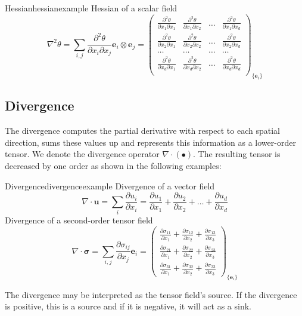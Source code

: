 \begin{example}{Hessian}{hessianexample}
    Hessian of a scalar field
    \begin{equation}
        \nabla^2 \theta = \sum_{i,j} \frac{\partial^2 \theta}{\partial x_i \partial x_j} \mathbf{e}_i \otimes \mathbf{e}_j
        = 
        \begin{pmatrix}
            \frac{\partial^2 \theta}{\partial x_1 \partial x_1} & \frac{\partial^2 \theta}{\partial x_1 \partial x_2} & \dots & \frac{\partial^2 \theta}{\partial x_1 \partial x_d}\\
            \frac{\partial^2 \theta}{\partial x_2 \partial x_1} & \frac{\partial^2 \theta}{\partial x_2 \partial x_2} & \dots & \frac{\partial^2 \theta}{\partial x_2 \partial x_d}\\
            \dots & \dots & \dots & \dots\\
            \frac{\partial^2 \theta}{\partial x_d \partial x_1} & \frac{\partial^2 \theta}{\partial x_d \partial x_2} & \dots & \frac{\partial^2 \theta}{\partial x_d \partial x_d}\\
        \end{pmatrix}_{\{\mathbf{e}_i\}}
    \end{equation}
\end{example}

\subsection{Divergence}
The divergence computes the partial derivative with respect to each spatial direction, sums these values up and represents this information as a lower-order tensor. We denote the divergence operator $\nabla \cdot (\bullet)$. The resulting tensor is decreased by one order as shown in the following examples:
\begin{example}{Divergence}{divergenceexample}
    Divergence of a vector field
    \begin{equation}
        \nabla \cdot \mathbf{u} =  \sum_i \frac{\partial u_i}{\partial x_i}
        = 
        \frac{\partial u_1}{\partial x_1} + \frac{\partial u_2}{\partial x_2} + \dots + \frac{\partial u_d}{\partial x_d}
    \end{equation}
    Divergence of a second-order tensor field
    \begin{equation}
        \nabla \cdot \pmb{\sigma} = \sum_{i,j} \frac{\partial \sigma_{ij}}{\partial x_j} \mathbf{e}_i
        = 
        \begin{pmatrix}
            \frac{\partial \sigma_{11}}{\partial x_1} + \frac{\partial \sigma_{12}}{\partial x_2} + \frac{\partial \sigma_{13}}{\partial x_3} \\
            \frac{\partial \sigma_{21}}{\partial x_1} + \frac{\partial \sigma_{22}}{\partial x_2} + \frac{\partial \sigma_{23}}{\partial x_3}\\
            \frac{\partial \sigma_{31}}{\partial x_1} + \frac{\partial \sigma_{32}}{\partial x_2} + \frac{\partial \sigma_{33}}{\partial x_3}
        \end{pmatrix}_{\{\mathbf{e}_i\}}
    \end{equation}
\end{example}

The divergence may be interpreted as the tensor field's source. If the divergence is positive, this is a source and if it is negative, it will act as a sink. 


 

